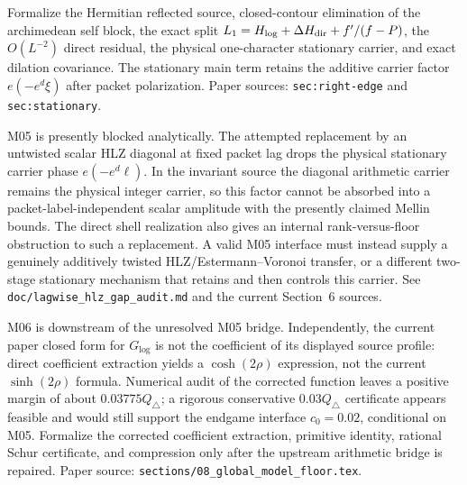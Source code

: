 \begin{definition}
\label{node:m04}
\notready
{}
Formalize the Hermitian reflected source, closed-contour elimination of the
archimedean self block, the exact split
$L_1=H_{\log}+\Delta H_{\rm dir}+f'/(f-P)$, the
$O(L^{-2})$ direct residual, the physical one-character stationary carrier,
and exact dilation covariance.  The stationary main term retains the additive
carrier factor $e(-e^d\xi)$ after packet polarization.  Paper sources:
\texttt{sec:right-edge} and \texttt{sec:stationary}.
\end{definition}

\begin{definition}
\label{node:m05}
\notready
{}
M05 is presently blocked analytically.  The attempted replacement by an
untwisted scalar HLZ diagonal at fixed packet lag drops the physical stationary
carrier phase $e(-e^d\ell)$.  In the invariant source the diagonal arithmetic
carrier remains the physical integer carrier, so this factor cannot be absorbed
into a packet-label-independent scalar amplitude with the presently claimed
Mellin bounds.  The direct shell realization also gives an internal
rank-versus-floor obstruction to such a replacement.  A valid M05 interface
must instead supply a genuinely additively twisted HLZ/Estermann--Voronoi
transfer, or a different two-stage stationary mechanism that retains and then
controls this carrier.  See \texttt{doc/lagwise\_hlz\_gap\_audit.md} and the
current Section~6 sources.
\end{definition}

\begin{definition}
\label{node:m06}
\notready
{}
M06 is downstream of the unresolved M05 bridge.  Independently, the current
paper closed form for $G_{\log}$ is not the coefficient of its displayed source
profile: direct coefficient extraction yields a $\cosh(2\rho)$ expression, not
the current $\sinh(2\rho)$ formula.  Numerical audit of the corrected function
leaves a positive margin of about $0.03775Q_\triangle$; a rigorous conservative
$0.03Q_\triangle$ certificate appears feasible and would still support the
endgame interface $c_0=0.02$, conditional on M05.  Formalize the corrected
coefficient extraction, primitive identity, rational Schur certificate, and
compression only after the upstream arithmetic bridge is repaired.  Paper
source: \texttt{sections/08\_global\_model\_floor.tex}.
\end{definition}


